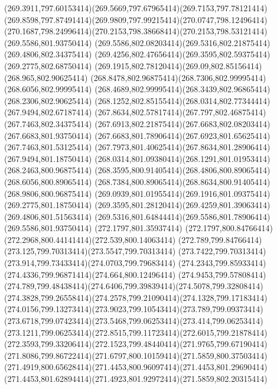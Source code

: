 {{	\curveto(269.3911,797.60153414)(269.5669,797.67965414)(269.7153,797.78121414)
	\curveto(269.8598,797.87491414)(269.9809,797.99215414)(270.0747,798.12496414)
	\curveto(270.1687,798.24996414)(270.2153,798.38668414)(270.2153,798.53121414)
	\closepath
	\moveto(269.5586,801.93750414)
	\curveto(269.5586,802.08203414)(269.5316,802.21875414)(269.4806,802.34375414)
	\curveto(269.4256,802.47656414)(269.3595,802.59375414)(269.2775,802.68750414)
	\curveto(269.1915,802.78120414)(269.09,802.85156414)(268.965,802.90625414)
	\curveto(268.8478,802.96875414)(268.7306,802.99995414)(268.6056,802.99995414)
	\curveto(268.4689,802.99995414)(268.3439,802.96865414)(268.2306,802.90625414)
	\curveto(268.1252,802.85155414)(268.0314,802.77344414)(267.9494,802.67187414)
	\curveto(267.8634,802.57817414)(267.797,802.46875414)(267.7463,802.34375414)
	\curveto(267.6913,802.21875414)(267.6683,802.08203414)(267.6683,801.93750414)
	\curveto(267.6683,801.78906414)(267.6923,801.65625414)(267.7463,801.53125414)
	\curveto(267.7973,801.40625414)(267.8634,801.28906414)(267.9494,801.18750414)
	\curveto(268.0314,801.09380414)(268.1291,801.01953414)(268.2463,800.96875414)
	\curveto(268.3595,800.91405414)(268.4806,800.89065414)(268.6056,800.89065414)
	\curveto(268.7384,800.89065414)(268.8634,800.91405414)(268.9806,800.96875414)
	\curveto(269.0939,801.01955414)(269.1916,801.09375414)(269.2775,801.18750414)
	\curveto(269.3595,801.28120414)(269.4259,801.39063414)(269.4806,801.51563414)
	\curveto(269.5316,801.64844414)(269.5586,801.78906414)(269.5586,801.93750414)
	\closepath
	\moveto(272.1797,801.35937414)
	\curveto(272.1797,800.84766414)(272.2968,800.44141414)(272.539,800.14063414)
	\curveto(272.789,799.84766414)(273.125,799.70313414)(273.5547,799.70313414)
	\curveto(273.7422,799.70313414)(273.914,799.73433414)(274.0703,799.79683414)
	\curveto(274.2343,799.85933414)(274.4336,799.96871414)(274.664,800.12496414)
	\lineto(274.9453,799.57808414)
	\curveto(274.789,799.48438414)(274.6406,799.39839414)(274.5078,799.32808414)
	\curveto(274.3828,799.26558414)(274.2578,799.21090414)(274.1328,799.17183414)
	\curveto(274.0156,799.13273414)(273.9023,799.10543414)(273.789,799.09373414)
	\curveto(273.6718,799.07423414)(273.5468,799.06253414)(273.414,799.06253414)
	\curveto(273.1211,799.06253414)(272.8515,799.11723414)(272.6015,799.21878414)
	\curveto(272.3593,799.33206414)(272.1523,799.48440414)(271.9765,799.67190414)
	\curveto(271.8086,799.86722414)(271.6797,800.10159414)(271.5859,800.37503414)
	\curveto(271.4919,800.65628414)(271.4453,800.96097414)(271.4453,801.29690414)
	\curveto(271.4453,801.62894414)(271.4923,801.92972414)(271.5859,802.20315414)
}}
